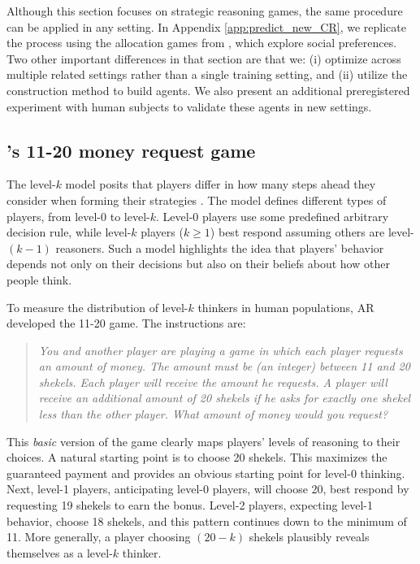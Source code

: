 \documentclass[11pt]{article}
\theoremstyle{definition}
\begin{document}
Although this section focuses on strategic reasoning games, the same procedure can be applied in any setting.
In Appendix \ref{app:predict_new_CR}, we replicate the process using the allocation games from \cite{charness2002understanding}, which explore social preferences.
Two other important differences in that section are that we: (i) optimize across multiple related settings rather than a single training setting, and (ii) utilize the construction method to build agents.
We also present an additional preregistered experiment with human subjects to validate these agents in new settings.


\subsection{\cite{1120Arad2012}'s 11-20 money request game}
\label{sec:11-20_app}

The level-$k$ model posits that players differ in how many steps ahead they consider when forming their strategies \citep{LkNagel1995,STAHL1994,STAHL1995}.
The model defines different types of players, from level-$0$ to level-$k$. 
Level-$0$ players use some predefined arbitrary decision rule, while level-$k$ players ($k \geq 1$) best respond assuming others are level-$(k-1)$ reasoners.
Such a model highlights the idea that players' behavior depends not only on their decisions but also on their beliefs about how other people think.

To measure the distribution of level-$k$ thinkers in human populations, AR developed the 11-20 game.
The instructions are:
\begin{quote}
\vspace{-.5cm}
\singlespacing
\emph{You and another player are playing a game in which each player requests an amount of money. The amount must be (an integer) between 11 and 20 shekels.  Each player will receive the amount he requests. A player will receive an additional amount of 20 shekels if he asks for exactly one shekel less than the other player. What amount of money would you request?}
\end{quote}
This \emph{basic} version of the game clearly maps players' levels of reasoning to their choices.
A natural starting point is to choose 20 shekels.
This maximizes the guaranteed payment and provides an obvious starting point for level-0 thinking.
Next, level-1 players, anticipating level-0 players, will choose 20, best respond by requesting 19 shekels to earn the bonus. 
Level-2 players, expecting level-1 behavior, choose 18 shekels, and this pattern continues down to the minimum of 11.
More generally, a player choosing $(20-k)$ shekels plausibly reveals themselves as a level-$k$ thinker.
\end{document}
